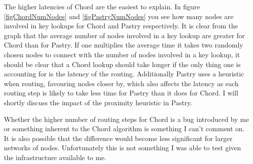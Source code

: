 \mbox{}

The higher latencies of Chord are the easiest to explain. In figure \ref{figChordNumNodes} and \ref{figPastryNumNodes} you see how many nodes are involved in key lookups for Chord and Pastry respectively. It is clear from the graph that the average number of nodes involved in a key lookup are greater for Chord than for Pastry. If one multiplies the average time it takes two randomly chosen nodes to connect with the number of nodes involved in a key lookup, it should be clear that a Chord lookup should take longer if the only thing one is accounting for is the latency of the routing. Additionally Pastry uses a heuristic when routing, favouring nodes closer by, which also affects the latency as each routing step is likely to take less time for Pastry than it does for Chord. I will shortly discuss the impact of the proximity heuristic in Pastry.

Whether the higher number of routing steps for Chord is a bug introduced by me or something inherent to the Chord algorithm is something I can't comment on. It is also possible that the difference would become less significant for larger networks of nodes. Unfortunately this is not something I was able to test given the infrastructure available to me.

